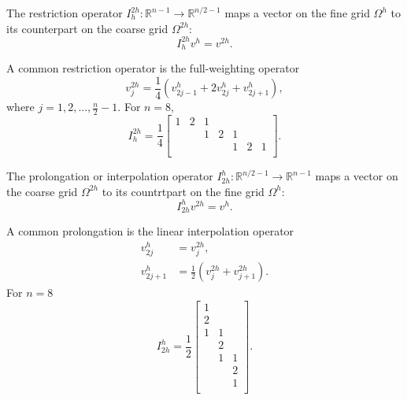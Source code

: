 \begin{defn}
  The restriction operator $I^{2h}_h:\mathbb{R}^{n-1}\rightarrow
  \mathbb{R}^{n/2-1}$ maps a vector on the fine grid $\Omega^h$
  to its counterpart on the coarse grid $\Omega^{2h}:$
  \begin{equation}
    I^{2h}_hv^h=v^{2h}.
  \end{equation}
\end{defn}

\begin{exm}
  A common restriction operator is the full-weighting operator
\begin{equation}
  v^{2h}_j=\frac{1}{4}(v^h_{2j-1}+2v^h_{2j}+v^h_{2j+1}),
\end{equation}
where $j=1,2,...,\frac{n}{2}-1$.
For $n=8,$
   \begin{equation}
     I^{2h}_{h}=\frac{1}{4}
     \begin{bmatrix}
       1 & 2& 1 & & & &\\
         & & 1  &2&1& &\\
        & &     & & 1&2&1\\
     \end{bmatrix}.
   \end{equation}
\end{exm}

\begin{defn}
  The prolongation or interpolation operator
  $I^h_{2h}:\mathbb{R}^{n/2-1}\rightarrow \mathbb{R}^{n-1}$
  maps a vector on the coarse grid $\Omega^{2h}$
  to its countrtpart on the fine grid $\Omega^h$:
  \begin{equation}
    I^h_{2h}v^{2h}=v^{h}.
  \end{equation}
\end{defn}


\begin{exm}\label{exm:linear}
   A common prolongation is the linear interpolation operator
  \begin{equation}
    \begin{aligned}
      v^h_{2j}&=v^{2h}_j,\\
      v^{h}_{2j+1}&=\frac{1}{2}(v^{2h}_j+v^{2h}_{j+1}).
    \end{aligned}
  \end{equation}
   For $n=8$
   \begin{equation}
     I^h_{2h}=\frac{1}{2}
     \begin{bmatrix}
       1 & &\\
       2& &\\
       1&1&  \\
       & 2& \\
       &1&1\\
       & & 2\\
       & & 1\\
     \end{bmatrix}.
   \end{equation}

  \end{exm}

